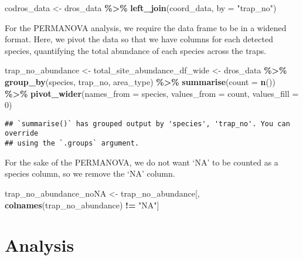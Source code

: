 \documentclass[
]{article}
\newenvironment{Shaded}{\begin{snugshade}}{\end{snugshade}}
\newcommand{\AttributeTok}[1]{\textcolor[rgb]{0.13,0.29,0.53}{#1}}
\newcommand{\DecValTok}[1]{\textcolor[rgb]{0.00,0.00,0.81}{#1}}
\newcommand{\FunctionTok}[1]{\textcolor[rgb]{0.13,0.29,0.53}{\textbf{#1}}}
\newcommand{\NormalTok}[1]{#1}
\newcommand{\OtherTok}[1]{\textcolor[rgb]{0.56,0.35,0.01}{#1}}
\newcommand{\SpecialCharTok}[1]{\textcolor[rgb]{0.81,0.36,0.00}{\textbf{#1}}}
\newcommand{\StringTok}[1]{\textcolor[rgb]{0.31,0.60,0.02}{#1}}
\begin{document}
\begin{Shaded}
\begin{Highlighting}[]
\NormalTok{codros\_data }\OtherTok{\textless{}{-}}\NormalTok{ dros\_data }\SpecialCharTok{\%\textgreater{}\%} \FunctionTok{left\_join}\NormalTok{(coord\_data, }\AttributeTok{by =} \StringTok{"trap\_no"}\NormalTok{)}
\end{Highlighting}
\end{Shaded}

For the PERMANOVA analysis, we require the data frame to be in a widened
format. Here, we pivot the data so that we have columns for each
detected species, quantifying the total abundance of each species across
the traps.

\begin{Shaded}
\begin{Highlighting}[]
\NormalTok{trap\_no\_abundance }\OtherTok{\textless{}{-}}\NormalTok{ total\_site\_abundance\_df\_wide }\OtherTok{\textless{}{-}}\NormalTok{ dros\_data }\SpecialCharTok{\%\textgreater{}\%}
  \FunctionTok{group\_by}\NormalTok{(species, trap\_no, area\_type) }\SpecialCharTok{\%\textgreater{}\%}
  \FunctionTok{summarise}\NormalTok{(}\AttributeTok{count =} \FunctionTok{n}\NormalTok{()) }\SpecialCharTok{\%\textgreater{}\%}
  \FunctionTok{pivot\_wider}\NormalTok{(}\AttributeTok{names\_from =}\NormalTok{ species, }\AttributeTok{values\_from =}\NormalTok{ count, }\AttributeTok{values\_fill =} \DecValTok{0}\NormalTok{)}
\end{Highlighting}
\end{Shaded}

\begin{verbatim}
## `summarise()` has grouped output by 'species', 'trap_no'. You can override
## using the `.groups` argument.
\end{verbatim}

For the sake of the PERMANOVA, we do not want `NA' to be counted as a
species column, so we remove the `NA' column.

\begin{Shaded}
\begin{Highlighting}[]
\NormalTok{trap\_no\_abundance\_noNA }\OtherTok{\textless{}{-}}\NormalTok{ trap\_no\_abundance[, }\FunctionTok{colnames}\NormalTok{(trap\_no\_abundance) }\SpecialCharTok{!=} \StringTok{"NA"}\NormalTok{]}
\end{Highlighting}
\end{Shaded}

\hypertarget{analysis}{%
\section{Analysis}\label{analysis}}
\end{document}
